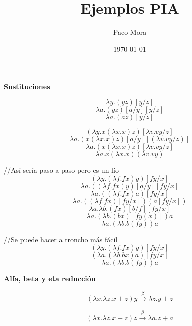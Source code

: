 \documentclass[openany]{book}
\title{Ejemplos PIA}
\author{Paco Mora}
\date{\today}
\begin{document}
\maketitle

\textbf{Sustituciones} 

$$ \lambda y.(yz)[y/z] $$
$$ \lambda a.(yz)[a/y][y/z] $$
$$ \lambda a.(az)[y/z] $$

$$ (\lambda y.x (\lambda x.x)z )[\lambda v.vy / z] $$
$$ \lambda a. (x(\lambda x.x)z) [a / y][(\lambda v.vy / z)] $$
$$ \lambda a. (x(\lambda x.x)z) [\lambda v.vy / z] $$
$$ \lambda a.x(\lambda x.x)(\lambda v.vy) $$


//Así sería paso a paso pero es un lío
$$ (\lambda y.(\lambda f.fx)y)[fy / x] $$
$$ \lambda a.((\lambda f.fx)y)[a /y][fy /x] $$
$$ \lambda a.((\lambda f.fx)a) [fy /x] $$
$$ \lambda a.((\lambda f.fx)[fy  /x])(a [fy /x]) $$
$$ \lambda a.\lambda b.(fx)[b /f][fy /x] $$
$$ \lambda a.(\lambda b.(bx)[fy (x)])a $$
$$ \lambda a.(\lambda b.b(fy))a $$

//Se puede hacer a troncho más fácil
$$ (\lambda y.(\lambda f.fx)y)[fy / x] $$
$$ (\lambda a.(\lambda b.bx)a)[fy / x] $$
$$ \lambda a.(\lambda b.b(fy))a $$

\textbf{Alfa, beta y eta reducción }

$$ (\lambda x.\lambda z.x+z)y \xrightarrow{\beta} \lambda z.y+z $$

$$ (\lambda x.\lambda z.x+z)z \xrightarrow{\beta} \lambda a.z+a $$
\end{document}
